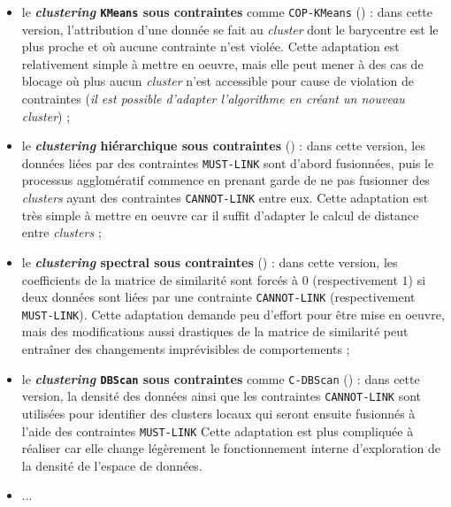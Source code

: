 		\begin{itemize}
			\item le \textbf{\textit{clustering} \texttt{KMeans} sous contraintes} comme \texttt{COP-KMeans} (\cite{wagstaff-etal:2001:constrained-kmeans-clustering}) :
			dans cette version, l'attribution d'une donnée se fait au \textit{cluster} dont le barycentre est le plus proche et où aucune contrainte n'est violée.
			Cette adaptation est relativement simple à mettre en oeuvre, mais elle peut mener à des cas de blocage où plus aucun \textit{cluster} n'est accessible pour cause de violation de contraintes (\textit{il est possible d'adapter l'algorithme en créant un nouveau \textit{cluster}}) ;
			\item le \textbf{\textit{clustering} hiérarchique sous contraintes} (\cite{davidson-ravi:2005:agglomerative-hierarchical-clustering}) :
			dans cette version, les données liées par des contraintes \texttt{MUST-LINK} sont d'abord fusionnées, puis le processus agglomératif commence en prenant garde de ne pas fusionner des \textit{clusters} ayant des contraintes \texttt{CANNOT-LINK} entre eux.
			Cette adaptation est très simple à mettre en oeuvre car il suffit d'adapter le calcul de distance entre \textit{clusters} ;
			\item le \textbf{\textit{clustering} spectral sous contraintes} (\cite{kamvar-etal:2003:spectral-learning}) :
			dans cette version, les coefficients de la matrice de similarité sont forcés à $0$ (respectivement $1$) si deux données sont liées par une contrainte \texttt{CANNOT-LINK} (respectivement \texttt{MUST-LINK}).
			Cette adaptation demande peu d'effort pour être mise en oeuvre, mais des modifications aussi drastiques de la matrice de similarité peut entraîner des changements imprévisibles de comportements ;
			\item le \textbf{\textit{clustering} \texttt{DBScan} sous contraintes} comme \texttt{C-DBScan} (\cite{ruiz-etal:2010:densitybased-semisupervised-clustering}) :
			dans cette version, la densité des données ainsi que les contraintes \texttt{CANNOT-LINK} sont utilisées pour identifier des clusters locaux qui seront ensuite fusionnés à l'aide des contraintes \texttt{MUST-LINK}
			Cette adaptation est plus compliquée à réaliser car elle change légèrement le fonctionnement interne d'exploration de la densité de l'espace de données.
			\item ...
		\end{itemize}
		
